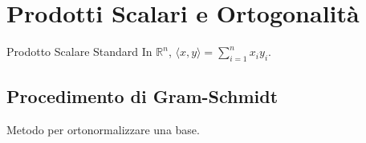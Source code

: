 \section{Prodotti Scalari e Ortogonalità}

\begin{concept}{Prodotto Scalare Standard}
In $\mathbb{R}^n$, $\langle x, y \rangle = \sum_{i=1}^n x_i y_i$.
\end{concept}

\subsection{Procedimento di Gram-Schmidt}
Metodo per ortonormalizzare una base.

